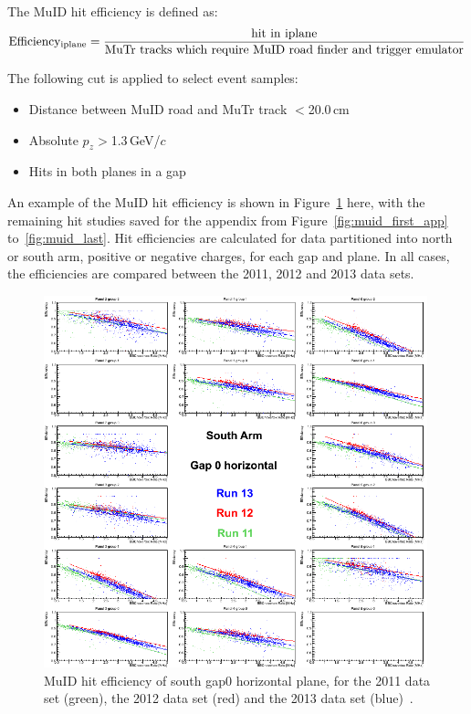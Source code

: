 {\noindent}The MuID hit efficiency is defined as:
\begin{equation}
{\rm Efficiency_{iplane}}=\frac{\rm hit~in~iplane}{\rm MuTr~tracks~which~require~MuID~road~finder~and~trigger~emulator}
\end{equation}

{\noindent}The following cut is applied to select event samples:
\begin{itemize}
  \item Distance between MuID road and MuTr track $<$20.0\,cm
  \item Absolute $p_{z}$$>$1.3\,GeV/$c$
  \item Hits in both planes in a gap
\end{itemize}

{\noindent}An example of the MuID hit efficiency is shown in
Figure~\ref{fig:muid_first} here, with the remaining hit studies saved for the
appendix from Figure~\ref{fig:muid_first_app} to~\ref{fig:muid_last}. Hit
efficiencies are calculated for data partitioned into north or south arm,
positive or negative charges, for each gap and plane.  In all cases, the
efficiencies are compared between the 2011, 2012 and 2013 data sets.

\begin{center}
  \begin{figure}[p]
    \includegraphics[width=0.99\textwidth]{./figures/efficomp_South_gap0_horizontal.png}
    \caption{
      \label{Fig:efficiency:MuIdEff:a0g0p0}MuID hit efficiency of south gap0
      horizontal plane, for the 2011 data set (green), the 2012 data set (red)
      and the 2013 data set (blue)~\cite{Seidl2014}.
    }
    \label{fig:muid_first}
  \end{figure}
\end{center}


